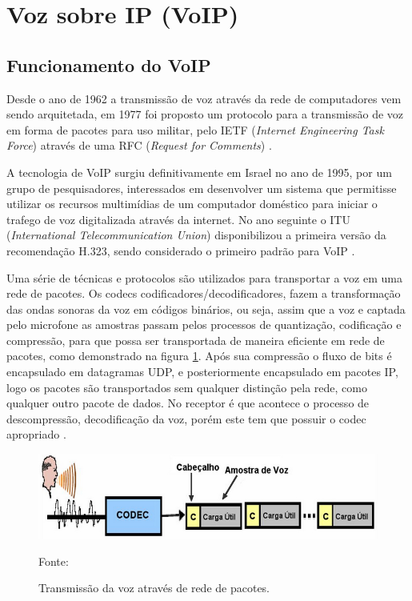 \section{Voz sobre IP (VoIP)} %
\subsection{Funcionamento do VoIP}
Desde o ano de 1962 a transmissão de voz através da rede de computadores vem sendo arquitetada, em 1977 foi proposto um protocolo para a transmissão de voz em forma de pacotes para uso militar, pelo IETF (\textit{Internet Engineering Task Force}) através de uma RFC (\textit{Request for Comments}) \cite{dancohen1977}.

A tecnologia de VoIP surgiu definitivamente em Israel no ano de 1995, por um grupo de pesquisadores, interessados em desenvolver um sistema que permitisse utilizar os recursos multimídias de um computador doméstico para iniciar o trafego de voz digitalizada através da internet. No ano seguinte o ITU (\textit{International Telecommunication Union}) disponibilizou a primeira versão da recomendação H.323, sendo considerado o primeiro padrão para VoIP \cite{eduardomaronasmonks2006}.

Uma série de técnicas e protocolos são utilizados para transportar a voz em uma rede de pacotes. Os codecs  codificadores/decodificadores, fazem a transformação das ondas sonoras da voz em  códigos binários, ou seja, assim que a voz e captada pelo microfone as amostras passam pelos processos de quantização, codificação e compressão, para que possa ser transportada de maneira eficiente em rede de pacotes, como demonstrado na figura \ref{Figura6}. Após sua compressão o fluxo de bits é encapsulado em datagramas UDP, e posteriormente encapsulado em pacotes IP, logo os pacotes são transportados sem qualquer distinção pela rede, como qualquer outro pacote de dados. No receptor é que acontece o processo de descompressão, decodificação da voz, porém este tem que possuir o codec apropriado \cite{eduardomaronasmonks2006}.

\begin{figure}[h]
	\centering
	\includegraphics[width=15.0cm]{imagens/transmissaoVozRde.jpg}
	\caption{Transmissão da voz através de rede de pacotes.}
    \label{Figura6}
    Fonte: \cite{eduardomaronasmonks2006}
\end{figure}

